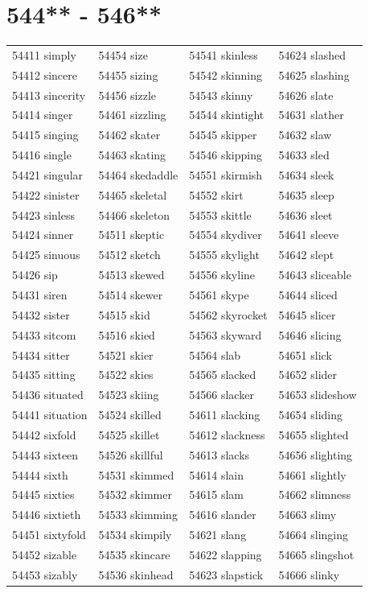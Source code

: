 \documentclass[10pt, oneside]{book}
\begin{document}
\begin{table}
	\centering
	\section*{544** - 546**}
	\begin{tabular}{l l l l}
54411 simply &54454 size &54541 skinless &54624 slashed\\
54412 sincere &54455 sizing &54542 skinning &54625 slashing\\
54413 sincerity &54456 sizzle &54543 skinny &54626 slate\\
54414 singer &54461 sizzling &54544 skintight &54631 slather\\
54415 singing &54462 skater &54545 skipper &54632 slaw\\
54416 single &54463 skating &54546 skipping &54633 sled\\
54421 singular &54464 skedaddle &54551 skirmish &54634 sleek\\
54422 sinister &54465 skeletal &54552 skirt &54635 sleep\\
54423 sinless &54466 skeleton &54553 skittle &54636 sleet\\
54424 sinner &54511 skeptic &54554 skydiver &54641 sleeve\\
54425 sinuous &54512 sketch &54555 skylight &54642 slept\\
54426 sip &54513 skewed &54556 skyline &54643 sliceable\\
54431 siren &54514 skewer &54561 skype &54644 sliced\\
54432 sister &54515 skid &54562 skyrocket &54645 slicer\\
54433 sitcom &54516 skied &54563 skyward &54646 slicing\\
54434 sitter &54521 skier &54564 slab &54651 slick\\
54435 sitting &54522 skies &54565 slacked &54652 slider\\
54436 situated &54523 skiing &54566 slacker &54653 slideshow\\
54441 situation &54524 skilled &54611 slacking &54654 sliding\\
54442 sixfold &54525 skillet &54612 slackness &54655 slighted\\
54443 sixteen &54526 skillful &54613 slacks &54656 slighting\\
54444 sixth &54531 skimmed &54614 slain &54661 slightly\\
54445 sixties &54532 skimmer &54615 slam &54662 slimness\\
54446 sixtieth &54533 skimming &54616 slander &54663 slimy\\
54451 sixtyfold &54534 skimpily &54621 slang &54664 slinging\\
54452 sizable &54535 skincare &54622 slapping &54665 slingshot\\
54453 sizably &54536 skinhead &54623 slapstick &54666 slinky\\
	\end{tabular}
 \end{table}
\clearpage
\end{document}
